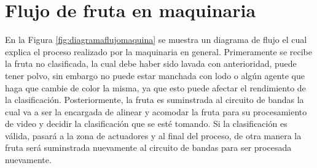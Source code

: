 \documentclass[twoside,spanish,ESP,MSc]{plantillaLabUPV}
\theoremstyle{definition}
\begin{document}
\section{Flujo de fruta en maquinaria}

En la Figura \ref{fig:diagramaflujomaquina} se muestra un diagrama de flujo el cual explica el proceso realizado por la maquinaria en general. Primeramente se recibe la fruta no clasificada, la cual debe haber sido lavada con anterioridad, puede tener polvo, sin embargo no puede estar manchada con lodo o algún agente que haga que cambie de color la misma, ya que esto puede afectar el rendimiento de la clasificación. Posteriormente, la fruta es suminstrada al circuito de bandas la cual va a ser la encargada de alinear y acomodar la fruta para su procesamiento de video y decidir la clasificación que se esté tomando. Si la clasificación es válida, pasará a la zona de actuadores y al final del proceso, de otra manera la fruta será suminstrada nuevamente al circuito de bandas para ser procesada nuevamente.
\end{document}
